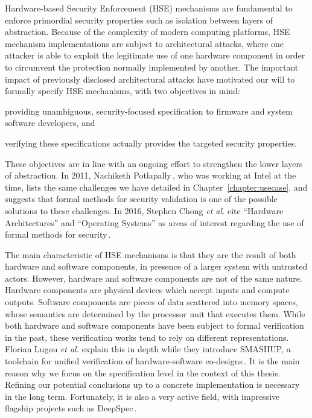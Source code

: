Hardware-based Security Enforcement (HSE) mechanisms are fundamental to enforce
primordial security properties such as isolation between layers of abstraction.
%
Because of the complexity of modern computing platforms, HSE mechanism
implementations are subject to architectural attacks, where one attacker is able
to exploit the legitimate use of one hardware component in order to circumvent
the protection normally implemented by another.
%
The important impact of previously disclosed architectural attacks have
motivated our will to formally specify HSE mechanisms, with two objectives in
mind:
%
\begin{inparaenum}[(1)]
\item providing unambiguous, security-focused specification to firmware and
  system software developers, and
%
\item verifying these specifications actually provides the targeted security
  properties.
\end{inparaenum}
%
These objectives are in line with an ongoing effort to strengthen the lower
layers of abstraction.
%
In 2011, Nachiketh Potlapally\,\cite{potlapally2011hardwaresecurity}, who was
working at Intel at the time, lists the same challenges we have detailed in
Chapter~\ref{chapter:usecase}, and suggests that formal methods for security
validation is one of the possible solutions to these challenges.
%
In 2016, Stephen Chong \emph{et al.} cite ``Hardware Architectures'' and
``Operating Systems'' as areas of interest regarding the use of formal methods
for security\,\cite{chong2016report}.

The main characteristic of HSE mechanisms is that they are the result of both
hardware and software components, in presence of a larger system with untrusted
actors.
%
However, hardware and software components are not of the same nature.
%
Hardware components are physical devices which accept inputs and compute
outputs.
%
Software components are pieces of data scattered into memory spaces, whose
semantics are determined by the processor unit that executes them.
%
While both hardware and software components have been subject to formal
verification in the past, these verification works tend to rely on different
representations.
%
Florian Lugou \emph{et al.} explain this in depth while they introduce SMASHUP,
a toolchain for unified verification of hardware-software
co-designs\,\cite{lugou2017smashup}.
%
It is the main reason why we focus on the specification level in the context of
this thesis.
%
Refining our potential conclusions up to a concrete implementation is necessary
in the long term.
%
Fortunately, it is also a very active field, with impressive flagship projects
such as DeepSpec\,\cite{appel2017deepspec}.

